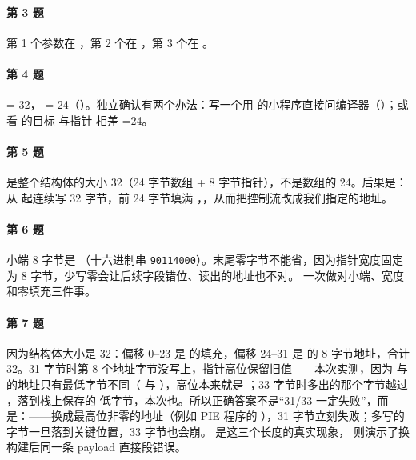 \documentclass[UTF8,12pt,oneside]{ctexbook}
\begin{document}
\paragraph{第 3 题}第 1 个参数在 ，第 2 个在 ，第 3 个在 。

\paragraph{第 4 题} = 32， = 24（）。独立确认有两个办法：写一个用  的小程序直接问编译器（）；或  看  的目标  与指针  相差 =24。

\paragraph{第 5 题} 是整个结构体的大小 32（24 字节数组 + 8 字节指针），不是数组的 24。后果是： 从  起连续写 32 字节，前 24 字节填满 ，，从而把控制流改成我们指定的地址。

\paragraph{第 6 题}小端 8 字节是 （十六进制串 \texttt{90114000}）。末尾零字节不能省，因为指针宽度固定为 8 字节，少写零会让后续字段错位、读出的地址也不对。 一次做对小端、宽度和零填充三件事。

\paragraph{第 7 题}因为结构体大小是 32：偏移 0--23 是  的填充，偏移 24--31 是  的 8 字节地址，合计 32。31 字节时第 8 个地址字节没写上，指针高位保留旧值——本次实测，因为  与  的地址只有最低字节不同（ 与 ），高位本来就是 ；33 字节时多出的那个字节越过 ，落到栈上保存的  低字节，本次也。所以正确答案不是“31/33 一定失败”，而是：——换成最高位非零的地址（例如 PIE 程序的 ），31 字节立刻失败；多写的字节一旦落到关键位置，33 字节也会崩。 是这三个长度的真实现象， 则演示了换构建后同一条 payload 直接段错误。
\end{document}
